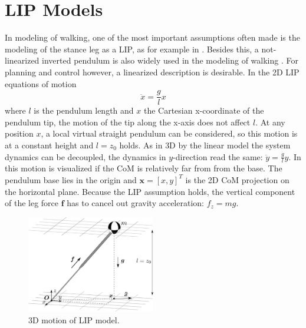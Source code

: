 \section{\ac{LIP} Models}
In modeling of walking, one of the most important assumptions often made is the modeling of the stance leg as a \acf{LIP}, as for example in \cite{kajita20013d}. Besides this, a not-linearized inverted pendulum is also widely used in the modeling of walking \cite{kuo2005energetic}. For planning and control however, a linearized description is desirable. In the \ac{2D} \ac{LIP} equations of motion
\begin{equation}
\ddot{x}=\frac{g}{l}x
\label{eq:LIPeom}
\end{equation}
where $l$ is the pendulum length and $x$ the Cartesian x-coordinate of the pendulum tip, the motion of the tip along the x-axis does not affect $l$. At any position $x$, a local virtual straight pendulum can be considered, so this motion is at a constant height and $l=z_0$  holds. As in \ac{3D} by the linear model the system dynamics can be decoupled, the dynamics in $y$-direction read the same: $\ddot{y}=\frac{g}{l} y$. In  this motion is visualized if the \ac{CoM} is relatively far from from the base. The pendulum base lies in the origin and $\boldsymbol{x} = [x,y]^T$ is the \ac{2D} \ac{CoM} projection on the horizontal plane. Because the \ac{LIP} assumption holds, the vertical component of the leg force $\boldsymbol{f}$ has to cancel out gravity acceleration: $f_z=mg$.
\begin{figure}[h]
\centering
\includegraphics[width=0.5\textwidth]{STYLESTUFF/3DCoMwithoutfoot.png}
\caption{\ac{3D} motion of \ac{LIP} model.}
\label{fig:3dlip}
\end{figure}

